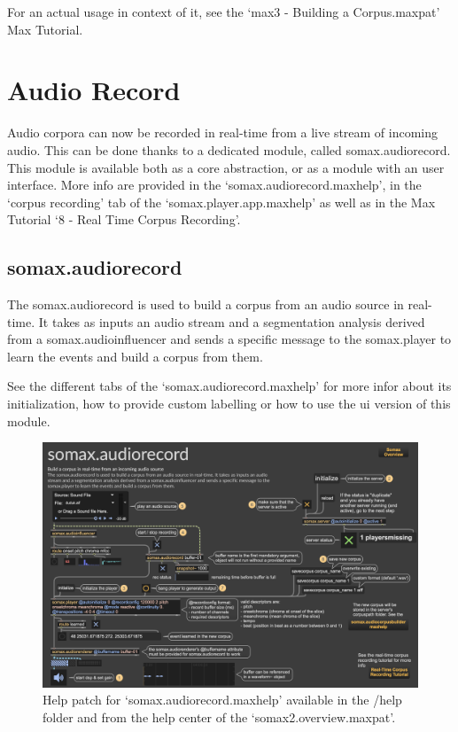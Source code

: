 For an actual usage in context of it, see the `max3 - Building a Corpus.maxpat' Max Tutorial.


\section{Audio Record}

Audio corpora can now be recorded in real-time from a live stream of incoming audio.
This can be done thanks to a dedicated module, called somax.audiorecord.
This module is available both as a core abstraction, or as a module with an user interface.
More info are provided in the `somax.audiorecord.maxhelp', in the `corpus recording' tab of the `somax.player.app.maxhelp' as well as in the Max Tutorial `8 - Real Time Corpus Recording'. 

\subsection{somax.audiorecord}

The somax.audiorecord is used to build a corpus from an audio source in real-time. It takes as inputs an audio stream and a segmentation analysis derived from a somax.audioinfluencer and sends a specific message to the somax.player to learn the events and build a corpus from them.

See the different tabs of the `somax.audiorecord.maxhelp' for more infor about its initialization, how to provide custom labelling or how to use the ui version of this module.

\begin{figure}[H]
    \centering        
 	\includegraphics[width=1\textwidth, keepaspectratio]{img/audiorecord_help.png}
    \caption{Help patch for `somax.audiorecord.maxhelp' available in the /help folder and from the help center of the `somax2.overview.maxpat'.}
    \label{fig:audiorecord_help}
\end{figure}



